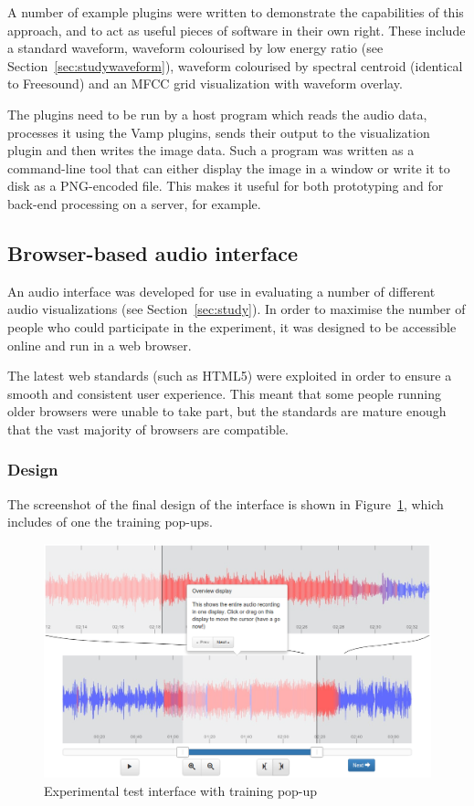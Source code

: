 A number of example plugins were written to demonstrate the capabilities of
this approach, and to act as useful pieces of software in their own right.
These include a standard waveform, waveform colourised by low energy ratio (see
Section~\ref{sec:studywaveform}), waveform colourised by spectral centroid
(identical to Freesound) and an MFCC grid visualization with waveform overlay.

The plugins need to be run by a host program which reads the audio data,
processes it using the Vamp plugins, sends their output to the visualization
plugin and then writes the image data. Such a program was written as a
command-line tool that can either display the image in a window or write it to
disk as a PNG-encoded file. This makes it useful for both prototyping and for
back-end processing on a server, for example.

\subsection{Browser-based audio interface}\label{sec:iface}
An audio interface was developed for use in evaluating a number of different
audio visualizations (see Section~\ref{sec:study}). In order to maximise the
number of people who could participate in the experiment, it was designed to be
accessible online and run in a web browser.

The latest web standards (such as HTML5) were exploited in order to ensure a
smooth and consistent user experience. This meant that some people running
older browsers were unable to take part, but the standards are mature enough
that the vast majority of browsers are compatible.

\subsubsection{Design}\label{sec:interfacedesign}
The screenshot of the  final design of the interface is shown in
Figure~\ref{fig:interface}, which includes of one the training pop-ups.

\begin{figure}[ht]
  \centering
  \includegraphics[width=\textwidth]{figs/interface.png}
  \caption{Experimental test interface with training pop-up}
  \label{fig:interface}
\end{figure}


